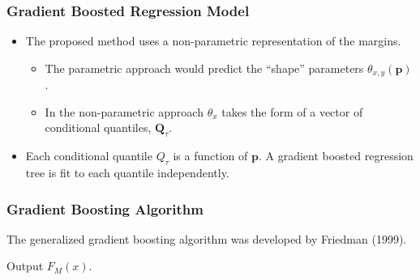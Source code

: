 \documentclass[t, pdftex]{beamer}
\begin{document}
\begin{frame}
\frametitle{Gradient Boosted Regression Model}
\begin{itemize}
\item The proposed method uses a non-parametric representation of the margins.
\begin{itemize}
	\item The parametric approach would predict the ``shape'' parameters $\theta_{x,y}(\mathbf{p})$.
	\item In the non-parametric approach $\theta_x$ takes the form of a vector of conditional quantiles, $\mathbf Q_\tau$.
\end{itemize}
\item  Each conditional quantile $Q_\tau$ is a function of $\mathbf p$. A gradient boosted regression tree is fit to each quantile independently.
\end{itemize}
\end{frame}

\begin{frame}[shrink=20]
\frametitle{Gradient Boosting Algorithm}

The generalized gradient boosting algorithm was developed by Friedman (1999).

\begin{algorithm}[H]

Output $F_M(x).$
\end{algorithm}
\end{frame}
\end{document}
